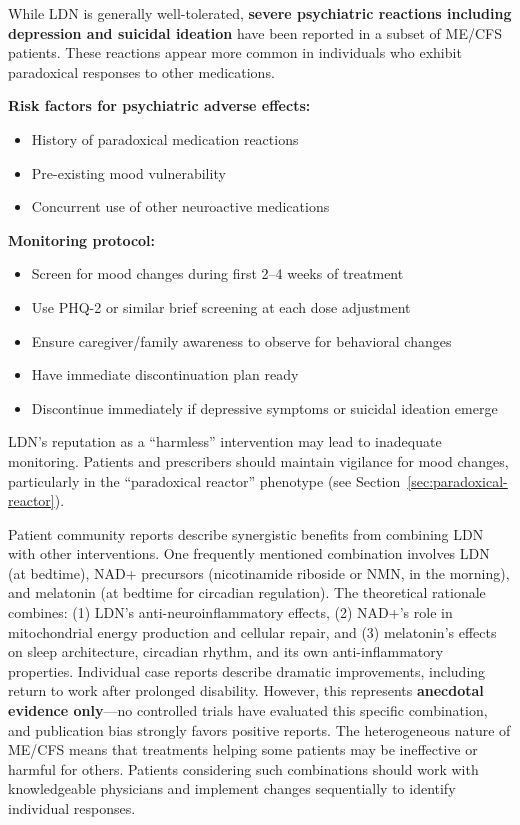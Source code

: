 \begin{warning}
\label{warn:ldn-psychiatric}
While LDN is generally well-tolerated, \textbf{severe psychiatric reactions including depression and suicidal ideation} have been reported in a subset of ME/CFS patients. These reactions appear more common in individuals who exhibit paradoxical responses to other medications.

\textbf{Risk factors for psychiatric adverse effects:}
\begin{itemize}
    \item History of paradoxical medication reactions
    \item Pre-existing mood vulnerability
    \item Concurrent use of other neuroactive medications
\end{itemize}

\textbf{Monitoring protocol:}
\begin{itemize}
    \item Screen for mood changes during first 2--4 weeks of treatment
    \item Use PHQ-2 or similar brief screening at each dose adjustment
    \item Ensure caregiver/family awareness to observe for behavioral changes
    \item Have immediate discontinuation plan ready
    \item Discontinue immediately if depressive symptoms or suicidal ideation emerge
\end{itemize}

LDN's reputation as a ``harmless'' intervention may lead to inadequate monitoring. Patients and prescribers should maintain vigilance for mood changes, particularly in the ``paradoxical reactor'' phenotype (see Section~\ref{sec:paradoxical-reactor}).
\end{warning}

\begin{speculation}
Patient community reports describe synergistic benefits from combining LDN with other interventions. One frequently mentioned combination involves LDN (at bedtime), NAD+ precursors (nicotinamide riboside or NMN, in the morning), and melatonin (at bedtime for circadian regulation). The theoretical rationale combines: (1) LDN's anti-neuroinflammatory effects, (2) NAD+'s role in mitochondrial energy production and cellular repair, and (3) melatonin's effects on sleep architecture, circadian rhythm, and its own anti-inflammatory properties. Individual case reports describe dramatic improvements, including return to work after prolonged disability. However, this represents \textbf{anecdotal evidence only}---no controlled trials have evaluated this specific combination, and publication bias strongly favors positive reports. The heterogeneous nature of ME/CFS means that treatments helping some patients may be ineffective or harmful for others. Patients considering such combinations should work with knowledgeable physicians and implement changes sequentially to identify individual responses.
\end{speculation}

